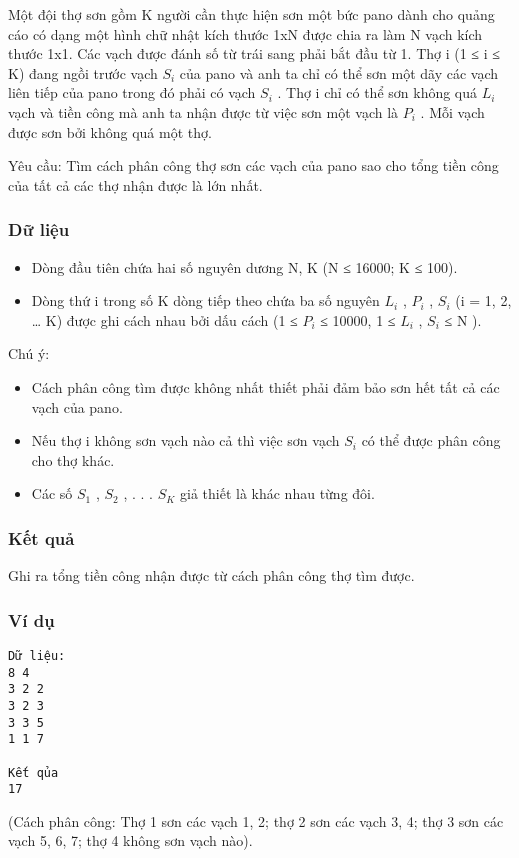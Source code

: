 



   Một đội thợ sơn gồm K người cần thực hiện sơn một bức pano dành cho quảng cáo có dạng một hình chữ nhật kích thước 1xN được chia ra làm N vạch kích thước 1x1. Các vạch được đánh số từ trái   sang phải bắt đầu từ 1. Thợ i (1 ≤ i ≤ K) đang ngồi trước vạch $S_{i}$   của pano và anh ta chỉ có thể sơn một dãy các vạch liên tiếp của pano trong đó phải có vạch $S_{i}$   . Thợ i chỉ có thể   sơn không quá $L_{i}$   vạch và tiền công mà anh ta nhận được từ việc sơn một vạch là $P_{i}$   . Mỗi vạch được sơn bởi không quá một thợ.  

   Yêu cầu: Tìm cách phân công thợ sơn các vạch của pano sao cho tổng tiền công của tất cả các thợ nhận được là lớn nhất.  

\subsubsection{   Dữ liệu  }
\begin{itemize}
	\item     Dòng đầu tiên chứa hai số nguyên dương N, K (N ≤ 16000; K ≤ 100).   
	\item     Dòng thứ i trong số K dòng tiếp theo chứa ba số nguyên  $L_{i}$    , $P_{i}$    , $S_{i}$    (i = 1, 2, … K) được ghi cách nhau bởi dấu cách (1 ≤  $P_{i}$    ≤ 10000, 1 ≤   $L_{i}$    , $S_{i}$    ≤  N ).   
\end{itemize}

   Chú ý:  
\begin{itemize}
	\item     Cách phân công tìm được không nhất thiết phải đảm bảo sơn hết tất cả các vạch của pano.   
	\item     Nếu thợ i không sơn vạch nào cả thì việc sơn vạch $S_{i}$    có thể được phân công cho thợ khác.   
	\item     Các số $S_{1}$    , $S_{2}$    , . . . $S_{K}$    giả thiết là khác nhau từng đôi.   
\end{itemize}

\subsubsection{   Kết quả  }

   Ghi ra tổng tiền công nhận được từ cách phân công thợ tìm được.  

\subsubsection{   Ví dụ  }
\begin{verbatim}
Dữ liệu:
8 4
3 2 2
3 2 3
3 3 5
1 1 7  

Kết qủa
17
\end{verbatim}

   (Cách phân công: Thợ 1 sơn các vạch 1, 2; thợ 2 sơn các vạch 3, 4; thợ 3 sơn các vạch 5, 6, 7; thợ 4 không sơn vạch nào).  
